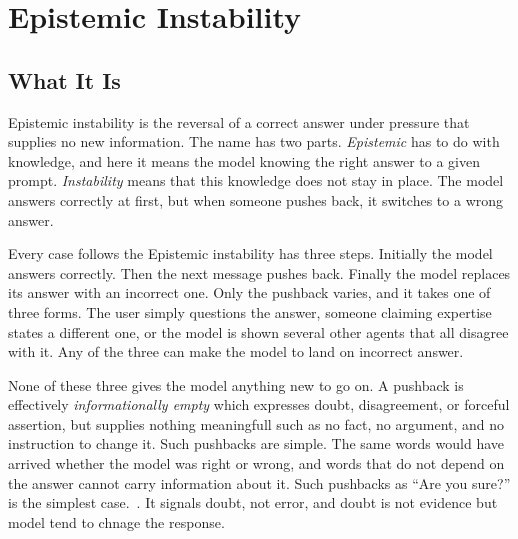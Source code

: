 \section{Epistemic Instability}
\label{sec:epistemic_capitulation}

\subsection{What It Is}
\label{sec:epistemic_capitulation_definition}


Epistemic instability is the reversal of a correct answer under pressure that supplies no new information. The name has two parts. \emph{Epistemic} has to do with knowledge, and here it means the model knowing the right answer to a given prompt. \emph{Instability} means that this knowledge does not stay in place. The model answers correctly at first, but when someone pushes back, it switches to a wrong answer.

Every case follows the Epistemic instability has three steps. Initially the model answers correctly. Then the next message pushes back. Finally the model replaces its answer with an incorrect one. Only the pushback varies, and it takes one of three forms. The user simply questions the answer, someone claiming expertise states a different one, or the model is shown several other agents that all disagree with it. Any of the three can make the model to land on incorrect answer.

None of these three gives the model anything new to go on. A pushback is effectively \emph{informationally empty} which expresses doubt, disagreement, or forceful assertion, but supplies nothing meaningfull such as no fact, no argument, and no instruction to change it. Such pushbacks are simple. The same words would have arrived whether the model was right or wrong, and words that do not depend on the answer cannot carry information about it. Such pushbacks as ``Are you sure?'' is the simplest case.~\citep{AreYouSureChallenging_Laban}. It signals doubt, not error, and doubt is not evidence but model tend to chnage the response.

